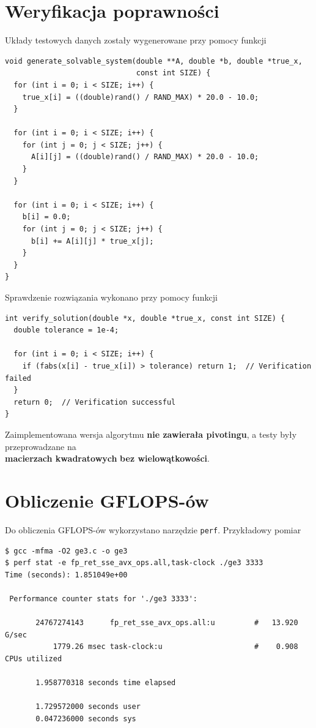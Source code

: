\documentclass[12pt]{article}
\begin{document}
\newpage














\section*{Weryfikacja poprawności}
Układy testowych danych zostały wygenerowane przy pomocy funkcji
\begin{verbatim}
void generate_solvable_system(double **A, double *b, double *true_x,
                              const int SIZE) {
  for (int i = 0; i < SIZE; i++) {
    true_x[i] = ((double)rand() / RAND_MAX) * 20.0 - 10.0;
  }

  for (int i = 0; i < SIZE; i++) {
    for (int j = 0; j < SIZE; j++) {
      A[i][j] = ((double)rand() / RAND_MAX) * 20.0 - 10.0;
    }
  }

  for (int i = 0; i < SIZE; i++) {
    b[i] = 0.0;
    for (int j = 0; j < SIZE; j++) {
      b[i] += A[i][j] * true_x[j];
    }
  }
}
\end{verbatim}

Sprawdzenie rozwiązania wykonano przy pomocy funkcji
\begin{verbatim}
int verify_solution(double *x, double *true_x, const int SIZE) {
  double tolerance = 1e-4;

  for (int i = 0; i < SIZE; i++) {
    if (fabs(x[i] - true_x[i]) > tolerance) return 1;  // Verification failed
  }
  return 0;  // Verification successful
}
\end{verbatim}

Zaimplementowana wersja algorytmu \textbf{nie zawierała pivotingu}, a testy były przeprowadzane na \\
\textbf{macierzach kwadratowych} \textbf{bez wielowątkowości}.

\section*{Obliczenie GFLOPS-ów}
Do obliczenia GFLOPS-ów wykorzystano narzędzie \verb|perf|.
Przykładowy pomiar
\begin{verbatim}
$ gcc -mfma -O2 ge3.c -o ge3
$ perf stat -e fp_ret_sse_avx_ops.all,task-clock ./ge3 3333
Time (seconds): 1.851049e+00

 Performance counter stats for './ge3 3333':

       24767274143      fp_ret_sse_avx_ops.all:u         #   13.920 G/sec
           1779.26 msec task-clock:u                     #    0.908 CPUs utilized

       1.958770318 seconds time elapsed

       1.729572000 seconds user
       0.047236000 seconds sys
\end{verbatim}
\end{document}
